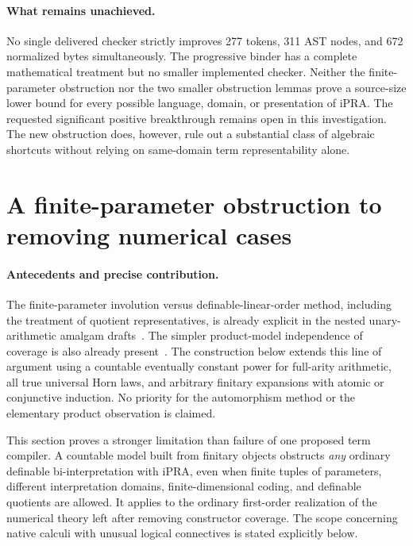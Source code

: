 \documentclass[11pt,letterpaper]{article}
\theoremstyle{definition}\newtheorem{definition}[theorem]{Definition}
\theoremstyle{remark}\newtheorem{remark}[theorem]{Remark}
\begin{document}
\paragraph{What remains unachieved.}
No single delivered checker strictly improves 277 tokens, 311 AST
nodes, and 672 normalized bytes simultaneously. The progressive
binder has a complete mathematical treatment but no smaller
implemented checker. Neither the finite-parameter obstruction nor
the two smaller obstruction lemmas prove a source-size lower bound
for every possible language, domain, or presentation of iPRA.
The requested significant positive breakthrough remains open in
this investigation. The new obstruction does, however, rule out
a substantial class of algebraic shortcuts without relying on
same-domain term representability alone.

\clearpage
\section{A finite-parameter obstruction to removing numerical cases}
\label{app:finite-parameter-obstruction}

\paragraph{Antecedents and precise contribution.}
The finite-parameter involution versus definable-linear-order method,
including the treatment of quotient representatives, is already explicit
in the nested unary-arithmetic amalgam drafts~\cite{prioramalgam}.
The simpler product-model independence of coverage is also already
present~\cite{priorproduct}. The construction below extends this line
of argument using a countable eventually constant power for full-arity
arithmetic, all true universal Horn laws, and arbitrary finitary
expansions with atomic or conjunctive induction. No priority for the
automorphism method or the elementary product observation is claimed.

This section proves a stronger limitation than failure of one proposed
term compiler.  A countable model built from finitary objects obstructs
\emph{any} ordinary definable bi-interpretation with iPRA, even when
finite tuples of parameters, different interpretation domains,
finite-dimensional coding, and definable quotients are allowed.
It applies to the ordinary first-order realization of the numerical
theory left after removing constructor coverage.  The scope concerning
native calculi with unusual logical connectives is stated explicitly
below.
\end{document}
